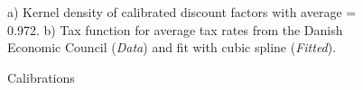 \begin{figure}[htb]
\caption[Caption for LOF]{Calibrations}
\label{fig:SS_dists}
 \centering
  {\scriptsize  a) Kernel density of calibrated discount factors with average = 0.972. b) Tax function for average tax rates from the Danish Economic Council (\textit{Data}) and fit with cubic spline (\textit{Fitted}).}
\end{figure}




